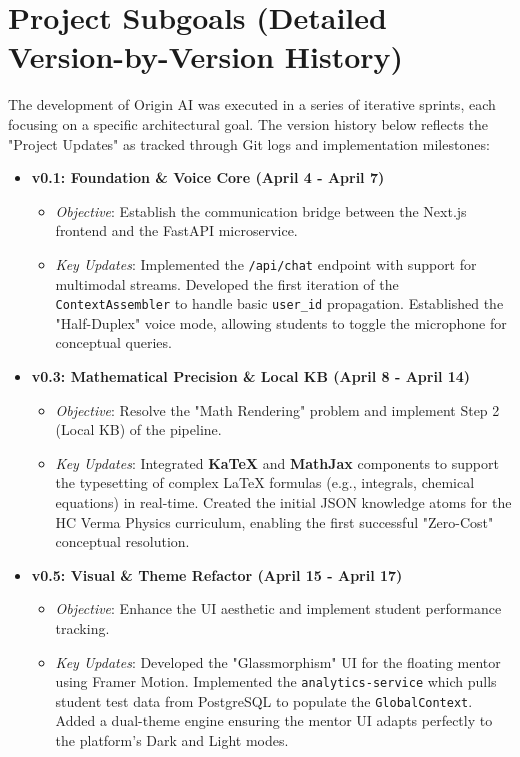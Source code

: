 \section{Project Subgoals (Detailed Version-by-Version History)}

The development of Origin AI was executed in a series of iterative sprints, each focusing on a specific architectural goal. The version history below reflects the "Project Updates" as tracked through Git logs and implementation milestones:

\begin{itemize}
\newpage
    \item \textbf{v0.1: Foundation \& Voice Core (April 4 - April 7)}  
    \begin{itemize}
        \item \textit{Objective}: Establish the communication bridge between the Next.js frontend and the FastAPI microservice.
        \item \textit{Key Updates}: Implemented the \texttt{/api/chat} endpoint with support for multimodal streams. Developed the first iteration of the \texttt{ContextAssembler} to handle basic \texttt{user\_id} propagation. Established the "Half-Duplex" voice mode, allowing students to toggle the microphone for conceptual queries.
    \end{itemize}

    \item \textbf{v0.3: Mathematical Precision \& Local KB (April 8 - April 14)}  
    \begin{itemize}
        \item \textit{Objective}: Resolve the "Math Rendering" problem and implement Step 2 (Local KB) of the pipeline.
        \item \textit{Key Updates}: Integrated \textbf{KaTeX} and \textbf{MathJax} components to support the typesetting of complex LaTeX formulas (e.g., integrals, chemical equations) in real-time. Created the initial JSON knowledge atoms for the HC Verma Physics curriculum, enabling the first successful "Zero-Cost" conceptual resolution.
    \end{itemize}

    \item \textbf{v0.5: Visual & Theme Refactor (April 15 - April 17)}  
    \begin{itemize}
        \item \textit{Objective}: Enhance the UI aesthetic and implement student performance tracking.
        \item \textit{Key Updates}: Developed the "Glassmorphism" UI for the floating mentor using Framer Motion. Implemented the \texttt{analytics-service} which pulls student test data from PostgreSQL to populate the \texttt{GlobalContext}. Added a dual-theme engine ensuring the mentor UI adapts perfectly to the platform's Dark and Light modes.
    \end{itemize}


\end{itemize}

